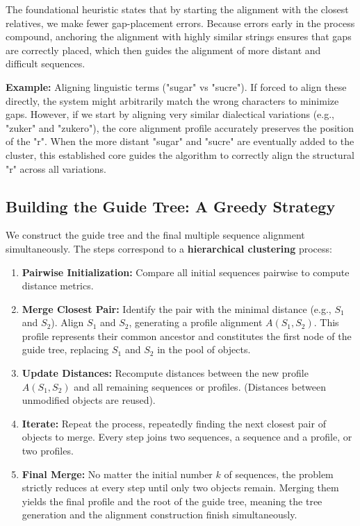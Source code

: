 The foundational heuristic states that by starting the alignment with the closest relatives, we make fewer gap-placement errors. Because errors early in the process compound, anchoring the alignment with highly similar strings ensures that gaps are correctly placed, which then guides the alignment of more distant and difficult sequences.

\textbf{Example:} Aligning linguistic terms ("sugar" vs "sucre").
If forced to align these directly, the system might arbitrarily match the wrong characters to minimize gaps. However, if we start by aligning very similar dialectical variations (e.g., "zuker" and "zukero"), the core alignment profile accurately preserves the position of the "r". When the more distant "sugar" and "sucre" are eventually added to the cluster, this established core guides the algorithm to correctly align the structural "r" across all variations.

\subsection{Building the Guide Tree: A Greedy Strategy}
We construct the guide tree and the final multiple sequence alignment simultaneously. The steps correspond to a \textbf{hierarchical clustering} process:

\begin{enumerate}
    \item \textbf{Pairwise Initialization:} Compare all initial sequences pairwise to compute distance metrics.
    \item \textbf{Merge Closest Pair:} Identify the pair with the minimal distance (e.g., $S_1$ and $S_2$). Align $S_1$ and $S_2$, generating a profile alignment $A(S_1, S_2)$. This profile represents their common ancestor and constitutes the first node of the guide tree, replacing $S_1$ and $S_2$ in the pool of objects.
    \item \textbf{Update Distances:} Recompute distances between the new profile $A(S_1, S_2)$ and all remaining sequences or profiles. (Distances between unmodified objects are reused).
    \item \textbf{Iterate:} Repeat the process, repeatedly finding the next closest pair of objects to merge. Every step joins two sequences, a sequence and a profile, or two profiles.
    \item \textbf{Final Merge:} No matter the initial number $k$ of sequences, the problem strictly reduces at every step until only two objects remain. Merging them yields the final profile and the root of the guide tree, meaning the tree generation and the alignment construction finish simultaneously.
\end{enumerate}

